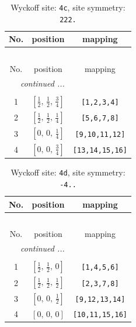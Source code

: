 \documentclass[fleqn,8pt]{jsarticle}
\begin{document}
\renewcommand{\arraystretch}{1.2}
\begin{longtable}{ccc}
\caption{Wyckoff site: {\tt 4c}, site symmetry: {\tt 222.}}
 \\
 \hline \hline
No. & position & mapping \\ \hline \endfirsthead

\multicolumn{2}{l}{\tablename\ \thetable{}} \\
 \hline \hline
No. & position & mapping \\ \hline \endhead

 \hline \hline
\multicolumn{2}{r}{\footnotesize\it continued ...} \\ \endfoot

 \hline \hline
\multicolumn{2}{r}{} \\ \endlastfoot

1 & $\left[ \frac{1}{2},\, \frac{1}{2},\, \frac{3}{4} \right]$ & {\tt [1,2,3,4]} \\ \hline
2 & $\left[ \frac{1}{2},\, \frac{1}{2},\, \frac{1}{4} \right]$ & {\tt [5,6,7,8]} \\ \hline
3 & $\left[ 0,\, 0,\, \frac{1}{4} \right]$ & {\tt [9,10,11,12]} \\ \hline
4 & $\left[ 0,\, 0,\, \frac{3}{4} \right]$ & {\tt [13,14,15,16]} \\
\end{longtable}
\renewcommand{\arraystretch}{1.2}
\begin{longtable}{ccc}
\caption{Wyckoff site: {\tt 4d}, site symmetry: {\tt -4..}}
 \\
 \hline \hline
No. & position & mapping \\ \hline \endfirsthead

\multicolumn{2}{l}{\tablename\ \thetable{}} \\
 \hline \hline
No. & position & mapping \\ \hline \endhead

 \hline \hline
\multicolumn{2}{r}{\footnotesize\it continued ...} \\ \endfoot

 \hline \hline
\multicolumn{2}{r}{} \\ \endlastfoot

1 & $\left[ \frac{1}{2},\, \frac{1}{2},\, 0 \right]$ & {\tt [1,4,5,6]} \\ \hline
2 & $\left[ \frac{1}{2},\, \frac{1}{2},\, \frac{1}{2} \right]$ & {\tt [2,3,7,8]} \\ \hline
3 & $\left[ 0,\, 0,\, \frac{1}{2} \right]$ & {\tt [9,12,13,14]} \\ \hline
4 & $\left[ 0,\, 0,\, 0 \right]$ & {\tt [10,11,15,16]} \\
\end{longtable}
\end{document}
